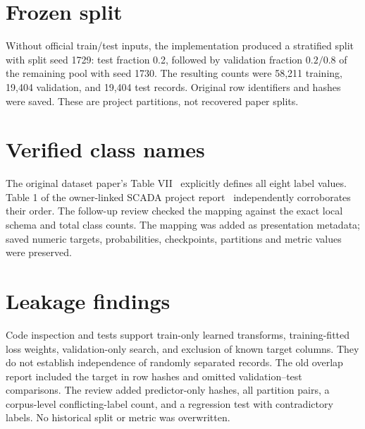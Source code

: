 \documentclass[11pt,a4paper]{report}
\begin{document}
\section{Frozen split}
Without official train/test inputs, the implementation produced a stratified split with split seed 1729: test fraction 0.2, followed by validation fraction $0.2/0.8$ of the remaining pool with seed 1730. The resulting counts were 58,211 training, 19,404 validation, and 19,404 test records. Original row identifiers and hashes were saved. These are project partitions, not recovered paper splits.
\begin{table}[htbp]\centering
\caption{Measured class distribution in the frozen real Gas split, with class names verified from the original dataset paper. Code 0 denotes normal operation.}\end{table}

\section{Verified class names}
The original dataset paper's Table VII~\cite{morris2014} explicitly defines all eight label values. Table 1 of the owner-linked SCADA project report~\cite{hsu2014} independently corroborates their order. The follow-up review checked the mapping against the exact local schema and total class counts. The mapping was added as presentation metadata; saved numeric targets, probabilities, checkpoints, partitions and metric values were preserved.
\begin{table}[htbp]\centering\small
\caption{Verified Gas Pipeline class names and actual local counts. MFCI is also called malicious function code injection in the corroborating report.}\end{table}

\section{Leakage findings}
Code inspection and tests support train-only learned transforms, training-fitted loss weights, validation-only search, and exclusion of known target columns. They do not establish independence of randomly separated records. The old overlap report included the target in row hashes and omitted validation--test comparisons. The review added predictor-only hashes, all partition pairs, a corpus-level conflicting-label count, and a regression test with contradictory labels. No historical split or metric was overwritten.
\end{document}
